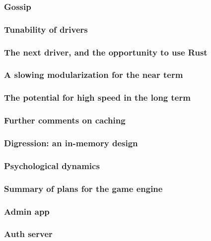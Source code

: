 \subsubsection{Gossip}
\label{sec:future:impl:gossip}


\subsubsection{Tunability of drivers}
\label{sec:future:impl:driver_tuning}


\subsubsection{The next driver, and the opportunity to use Rust}
\label{sec:future:impl:rust}


\subsubsection{A slowing modularization for the near term}
\label{sec:future:impl:shortTerm}


\subsubsection{The potential for high speed in the long term}
\label{sec:future:impl:longTerm}


\subsubsection{Further comments on caching}
\label{sec:future:impl:moreCaching}


\subsubsection{Digression: an in-memory design}
\label{sec:future:impl:inMemoryDB}


\subsubsection{Psychological dynamics}
\label{sec:future:impl:psycho}


\subsubsection{Summary of plans for the game engine}
\label{sec:future:impl:engineSummary}


\subsubsection{Admin app}
\label{sec:future:impl:adminApp}


\subsubsection{Auth server}
\label{sec:future:impl:authServer}

